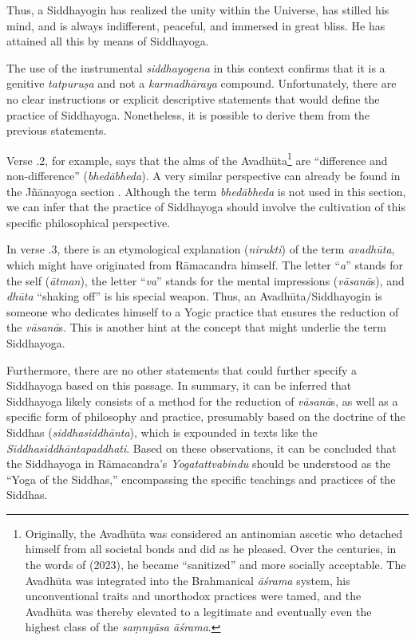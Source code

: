 Thus, a Siddhayogin has realized the unity within the Universe, has stilled his mind, and is always indifferent, peaceful, and immersed in great bliss. He has attained all this by means of Siddhayoga.

The use of the instrumental \textit{siddhayogena} in this context confirms that it is a genitive \textit{tatpuruṣa} and not a \textit{karmadhāraya} compound. Unfortunately, there are no clear instructions or explicit descriptive statements that would define the practice of Siddhayoga. Nonetheless, it is possible to derive them from the previous statements.

Verse .2, for example, says that the alms of the Avadhūta\footnote{Originally, the Avadhūta was considered an antinomian ascetic who detached himself from all societal bonds and did as he pleased. Over the centuries, in the words of \citeauthor{pudi2023} (2023), he became ``sanitized'' and more socially acceptable. The Avadhūta was integrated into the Brahmanical \textit{āśrama} system, his unconventional traits and unorthodox practices were tamed, and the Avadhūta was thereby elevated to a legitimate and eventually even the highest class of the \textit{saṃnyāsa āśrama}.} are ``difference and non-difference'' (\textit{bhedābheda}). A very similar perspective can already be found in the Jñānayoga section . Although the term \textit{bhedābheda} is not used in this section, we can infer that the practice of Siddhayoga should involve the cultivation of this specific philosophical perspective.

In verse .3, there is an etymological explanation (\textit{nirukti}) of the term \textit{avadhūta}, which might have originated from Rāmacandra himself. The letter ``\textit{a}'' stands for the self (\textit{ātman}), the letter ``\textit{va}'' stands for the mental impressions (\textit{vāsanā}s), and \textit{dhūta} ``shaking off'' is his special weapon. Thus, an Avadhūta/Siddhayogin is someone who dedicates himself to a Yogic practice that ensures the reduction of the \textit{vāsanā}s. This is another hint at the concept that might underlie the term Siddhayoga.

Furthermore, there are no other statements that could further specify a Siddhayoga based on this passage. In summary, it can be inferred that Siddhayoga likely consists of a method for the reduction of \textit{vāsanā}s, as well as a specific form of philosophy and practice, presumably based on the doctrine of the Siddhas (\textit{siddhasiddhānta}), which is expounded in texts like the \textit{Siddhasiddhāntapaddhati}. Based on these observations, it can be concluded that the Siddhayoga in Rāmacandra's \emph{Yogatattvabindu} should be understood as the ``Yoga of the Siddhas,'' encompassing the specific teachings and practices of the Siddhas.


